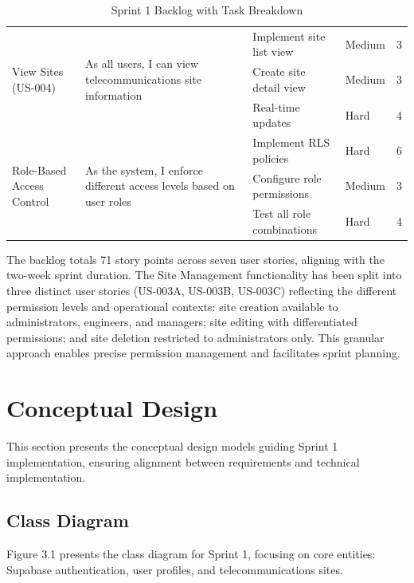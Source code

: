 \begin{table}[H]
\begin{tabular}{|p{2.5cm}|p{4cm}|p{3.2cm}|p{2.2cm}|p{1.5cm}|}
\multirow{3}{2.5cm}{View Sites (US-004)} & 
\multirow{3}{4cm}{As all users, I can view telecommunications site information}
& Implement site list view & Medium & 3 \\
\cline{3-5}
& & Create site detail view & Medium & 3 \\
\cline{3-5}
& & Real-time updates & Hard & 4 \\
\hline

\multirow{3}{2.5cm}{Role-Based Access Control} & 
\multirow{3}{4cm}{As the system, I enforce different access levels based on user roles}
& Implement RLS policies & Hard & 6 \\
\cline{3-5}
& & Configure role permissions & Medium & 3 \\
\cline{3-5}
& & Test all role combinations & Hard & 4 \\
\hline

\end{tabular}
\caption{Sprint 1 Backlog with Task Breakdown}
\label{tab:sprint1_backlog}
\end{table}

The backlog totals 71 story points across seven user stories, aligning with the two-week sprint duration. The Site Management functionality has been split into three distinct user stories (US-003A, US-003B, US-003C) reflecting the different permission levels and operational contexts: site creation available to administrators, engineers, and managers; site editing with differentiated permissions; and site deletion restricted to administrators only. This granular approach enables precise permission management and facilitates sprint planning.

\section{Conceptual Design}

This section presents the conceptual design models guiding Sprint 1 implementation, ensuring alignment between requirements and technical implementation.

\subsection{Class Diagram}

Figure 3.1 presents the class diagram for Sprint 1, focusing on core entities: Supabase authentication, user profiles, and telecommunications sites.

